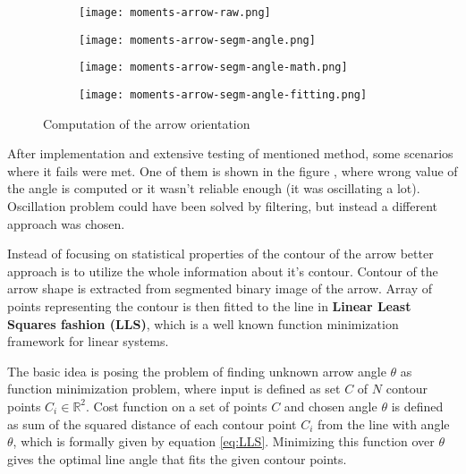\begin{figure}[th!]
	\centering
	\begin{subfigure}[b]{0.45\textwidth}
		\centering
		\texttt{[image: moments-arrow-raw.png]}
	\end{subfigure}
	\begin{subfigure}[b]{0.45\textwidth}
		\centering
		\texttt{[image: moments-arrow-segm-angle.png]}
	\end{subfigure}
		\begin{subfigure}[b]{0.45\textwidth}
			\centering
			\texttt{[image: moments-arrow-segm-angle-math.png]}
		\end{subfigure}
		\begin{subfigure}[b]{0.45\textwidth}
			\centering
			\texttt{[image: moments-arrow-segm-angle-fitting.png]}
			\label{fig:line-fitting}
		\end{subfigure}
	\caption{Computation of the arrow orientation}
	\label{fig:arrow-angle-computation}
\end{figure}

After implementation and extensive testing of mentioned method, some scenarios where it fails were met. One of them is shown in the figure , where wrong value of the angle is computed or it wasn't reliable enough (it was oscillating a lot). Oscillation problem could have been solved by filtering, but instead a different approach was chosen.

Instead of focusing on statistical properties of the contour of the arrow better approach is to utilize the whole information about it's contour. Contour of the arrow shape is extracted from segmented binary image of the arrow. Array of points representing the contour is then fitted to the line in \textbf{Linear Least Squares fashion (LLS)}, which is a well known function minimization framework for linear systems.

The basic idea is posing the problem of finding unknown arrow angle $\theta$ as function minimization problem, where input is defined as set $C$ of $N$ contour points $C_i \in \mathbb{R}^2$. Cost function on a set of points $C$ and chosen angle $\theta$ is defined as sum of the squared distance of each contour point $C_i$ from the line with angle $\theta$, which is formally given by equation \ref{eq:LLS}. Minimizing this function over $\theta$ gives the optimal line angle that fits the given contour points.

